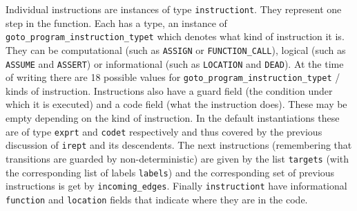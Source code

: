 \documentclass{article}
\newcommand{\code}[1]{\texttt{#1}}
\begin{document}
Individual instructions are instances of type \code{instructiont}.
They represent one step in the function.  Each has a type, an instance
of \code{goto\_program\_instruction\_typet} which denotes what kind of
instruction it is.  They can be computational (such as \code{ASSIGN}
or \code{FUNCTION\_CALL}), logical (such as \code{ASSUME} and
\code{ASSERT}) or informational (such as \code{LOCATION} and
\code{DEAD}).  At the time of writing there are 18 possible values for
\code{goto\_program\_instruction\_typet} / kinds of instruction.
Instructions also have a guard field (the condition under which it is
executed) and a code field (what the instruction does).  These may be
empty depending on the kind of instruction.  In the default
instantiations these are of type \code{exprt} and \code{codet}
respectively and thus covered by the previous discussion of
\code{irept} and its descendents.  The next instructions (remembering
that transitions are guarded by non-deterministic) are given by the
list \code{targets} (with the corresponding list of labels
\code{labels}) and the corresponding set of previous instructions is
get by \code{incoming\_edges}.  Finally \code{instructiont} have
informational \code{function} and \code{location} fields that indicate
where they are in the code.
\end{document}
